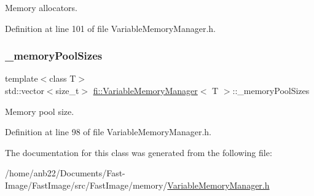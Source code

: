 Memory allocators. 



Definition at line 101 of file Variable\+Memory\+Manager.\+h.

\mbox{\label{classfi_1_1VariableMemoryManager_a52671e5b09a6e742cd6fcf1e5014569d}} 
\subsubsection{\texorpdfstring{\+\_\+memory\+Pool\+Sizes}{\_memoryPoolSizes}}
{\footnotesize\ttfamily template$<$class T$>$ \\
std\+::vector$<$size\+\_\+t$>$ \hyperlink{classfi_1_1VariableMemoryManager}{fi\+::\+Variable\+Memory\+Manager}$<$ T $>$\+::\+\_\+memory\+Pool\+Sizes\hspace{0.3cm}{\ttfamily [private]}}



Memory pool size. 



Definition at line 98 of file Variable\+Memory\+Manager.\+h.



The documentation for this class was generated from the following file\+:\begin{DoxyCompactItemize}
\item 
/home/anb22/\+Documents/\+Fast-\/\+Image/\+Fast\+Image/src/\+Fast\+Image/memory/\hyperlink{VariableMemoryManager_8h}{Variable\+Memory\+Manager.\+h}\end{DoxyCompactItemize}
